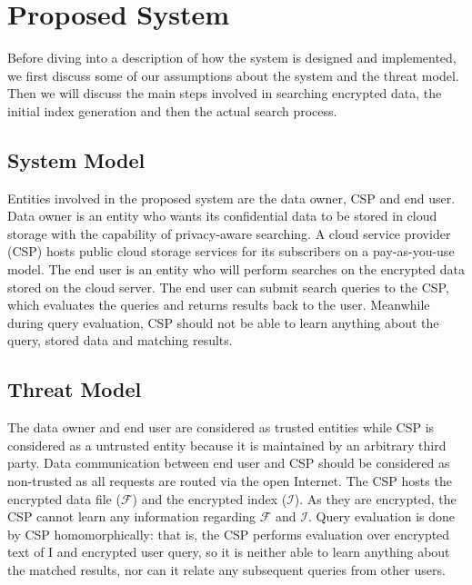 \section{Proposed System}
\label{sec:system}

Before diving into a description of how the system
is designed and implemented, we first discuss some of our assumptions
about the system and the threat model. Then we will discuss the main
steps involved in searching encrypted data, the initial index generation
and then the actual search process.

\subsection{System Model}

Entities involved in the proposed system are the data owner, CSP and end user.
Data owner is an entity who wants its confidential data to be stored in cloud storage with the capability of privacy-aware searching. 
A cloud service provider (CSP) hosts public cloud storage services for its subscribers on 
a pay-as-you-use model. The end user is an entity who will perform searches on the 
encrypted data stored on the cloud server. The end user can submit search queries 
to the CSP, which evaluates the queries and returns results back to the user. 
Meanwhile during query evaluation, CSP should not be able to learn anything about the query, stored 
data and matching results.

\subsection{Threat Model}

The data owner and end user are considered as trusted entities while CSP 
is considered as a untrusted entity because it is maintained by an 
arbitrary third party. Data communication between end user and CSP should 
be considered as non-trusted as all requests are routed via the open Internet. 
The CSP hosts the encrypted data file ($\mathcal{F}$) and the encrypted index ($\mathcal{I}$). 
As they are encrypted, the CSP cannot learn any information regarding $\mathcal{F}$ and $\mathcal{I}$. 
Query evaluation is done by CSP homomorphically: that is, the CSP performs 
evaluation over encrypted text of I and encrypted user query, 
so it is neither able to learn anything about the matched results, nor
can it relate any subsequent queries from other users. 


